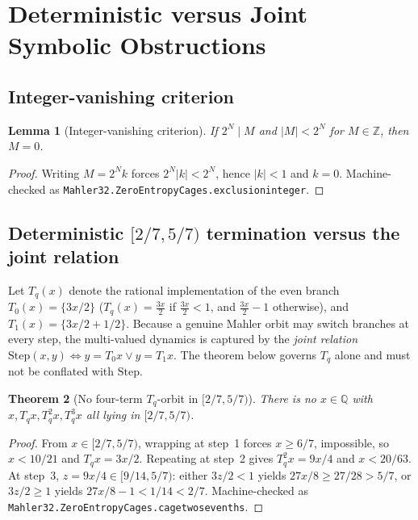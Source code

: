 \documentclass[11pt,a4paper]{article}
\newtheorem{theorem}{Theorem}[section]
\newtheorem{lemma}[theorem]{Lemma}
\theoremstyle{remark}
\newcommand{\Q}{\mathbb{Q}}
\newcommand{\Z}{\mathbb{Z}}
\renewcommand{\_}{\textunderscore\allowbreak}
\newcommand{\lean}[1]{\texttt{#1}}
\begin{document}
\section{Deterministic versus Joint Symbolic Obstructions}
\label{sec:obstructions}

\subsection{Integer-vanishing criterion}

\begin{lemma}[Integer-vanishing criterion]
\label{lem:engine2}
If $2^{N}\mid M$ and $|M|<2^{N}$ for $M\in\Z$, then $M=0$.
\end{lemma}

\begin{proof}
Writing $M=2^N k$ forces $2^N|k|<2^N$, hence $|k|<1$ and $k=0$. Machine-checked as \lean{Mahler32.\allowbreak ZeroEntropyCages.\allowbreak exclusion\_integer}.
\end{proof}

\subsection{Deterministic \texorpdfstring{$[2/7,5/7)$}{[2/7,5/7)} termination versus the joint relation}

Let $T_q(x)$ denote the rational implementation of the even branch $T_0(x)=\{3x/2\}$ ($T_q(x)=\tfrac{3x}{2}$ if $\tfrac{3x}{2}<1$, and $\tfrac{3x}{2}-1$ otherwise), and $T_1(x)=\{3x/2+1/2\}$. Because a genuine Mahler orbit may switch branches at every step, the multi-valued dynamics is captured by the \emph{joint relation} $\mathrm{Step}(x,y)\iff y=T_0 x \lor y=T_1 x$. The theorem below governs $T_q$ alone and must not be conflated with $\mathrm{Step}$.

\begin{theorem}[No four-term $T_q$-orbit in {$[2/7,5/7)$}]
\label{thm:obstruction}
There is no $x\in\Q$ with $x,T_q x,T_q^{2}x,T_q^{3}x$ all lying in $[2/7,5/7)$.
\end{theorem}

\begin{proof}
From $x\in[2/7,5/7)$, wrapping at step~1 forces $x\ge 6/7$, impossible, so $x<10/21$ and $T_q x=3x/2$. Repeating at step~2 gives $T_q^2 x=9x/4$ and $x<20/63$. At step~3, $z=9x/4\in[9/14,5/7)$: either $3z/2<1$ yields $27x/8\ge 27/28>5/7$, or $3z/2\ge 1$ yields $27x/8-1<1/14<2/7$. Machine-checked as \lean{Mahler32.\allowbreak ZeroEntropyCages.\allowbreak cage\_two\_sevenths}.
\end{proof}
\end{document}
